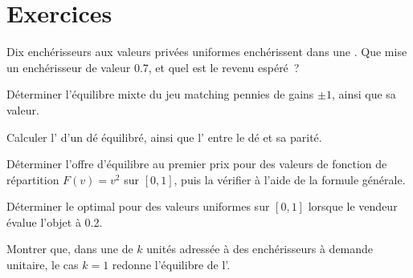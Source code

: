 \section{Exercices}

\begin{exercise}[$\star$]\label{exo:qm:games-auctions-and-information:1}
Dix enchérisseurs aux valeurs privées uniformes enchérissent dans une . Que mise un enchérisseur de valeur 0.7, et quel est le revenu espéré~?
\end{exercise}

\begin{exercise}[$\star$]\label{exo:qm:games-auctions-and-information:2}
Déterminer l'équilibre mixte du jeu matching pennies de gains $\pm1$, ainsi que sa valeur.
\end{exercise}

\begin{exercise}[$\star$]\label{exo:qm:games-auctions-and-information:3}
Calculer l' d'un dé équilibré, ainsi que l' entre le dé et sa parité.
\end{exercise}

\begin{exercise}[$\star\star$]\label{exo:qm:games-auctions-and-information:4}
Déterminer l'offre d'équilibre au premier prix pour des valeurs de fonction de répartition $F(v) = v^2$ sur $[0, 1]$, puis la vérifier à l'aide de la formule générale.
\end{exercise}

\begin{exercise}[$\star\star$]\label{exo:qm:games-auctions-and-information:5}
Déterminer le  optimal pour des valeurs uniformes sur $[0, 1]$ lorsque le vendeur évalue l'objet à 0.2.
\end{exercise}

\begin{exercise}[$\star\star$]\label{exo:qm:games-auctions-and-information:6}
Montrer que, dans une  de $k$ unités adressée à des enchérisseurs à demande unitaire, le cas $k = 1$ redonne l'équilibre de l'.
\end{exercise}

